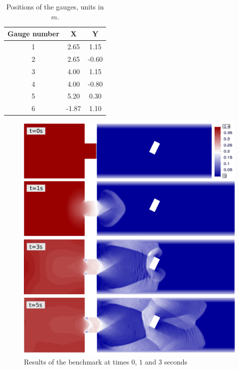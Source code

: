 \documentclass[a4paper,12pt]{article}
\begin{document}
\begin{table}
\centering
\begin{tabular}{ccc}
\hline
Gauge number & X & Y \\ \hline
1 &  2.65 &  1.15 \\
2 &  2.65 & -0.60 \\
3 &  4.00 &  1.15 \\
4 &  4.00 & -0.80 \\
5 &  5.20 &  0.30 \\
6 & -1.87 &  1.10 \\ \hline
\end{tabular}
\caption{Positions of the gauges, units in $m$.}
\label{gauges_positions}
\end{table}


\begin{figure}
\centering
\includegraphics[width=\textwidth]{img/exp/results.png}
\caption{Results of the benchmark at times $0$, $1$ and $3$ seconds}
\label{experiment_plots}
\end{figure}
\end{document}
